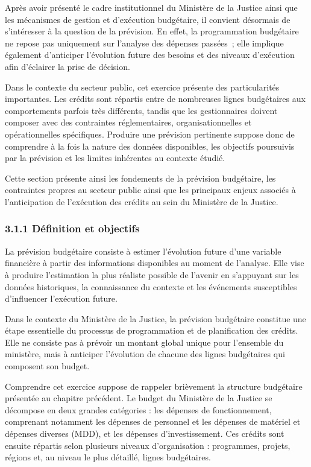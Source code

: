 Apr\`es avoir pr\'esent\'e le cadre institutionnel du Minist\`ere de la
Justice ainsi que les m\'ecanismes de gestion et d'ex\'ecution budg\'etaire,
il convient d\'esormais de s'int\'eresser \`a la question de la pr\'evision.
En effet, la programmation budg\'etaire ne repose pas uniquement sur
l'analyse des d\'epenses pass\'ees~; elle implique \'egalement d'anticiper
l'\'evolution future des besoins et des niveaux d'ex\'ecution afin
d'\'eclairer la prise de d\'ecision.

Dans le contexte du secteur public, cet exercice pr\'esente des
particularit\'es importantes. Les cr\'edits sont r\'epartis entre de
nombreuses lignes budg\'etaires aux comportements parfois tr\`es
diff\'erents, tandis que les gestionnaires doivent composer avec des
contraintes r\'eglementaires, organisationnelles et op\'erationnelles
sp\'ecifiques. Produire une pr\'evision pertinente suppose donc de
comprendre \`a la fois la nature des donn\'ees disponibles, les objectifs
poursuivis par la pr\'evision et les limites inh\'erentes au contexte
\'etudi\'e.

Cette section pr\'esente ainsi les fondements de la pr\'evision
budg\'etaire, les contraintes propres au secteur public ainsi que les
principaux enjeux associ\'es \`a l'anticipation de l'ex\'ecution des
cr\'edits au sein du Minist\`ere de la Justice.

\subsubsection*{3.1.1 \quad D\'efinition et objectifs}
La prévision budgétaire consiste à estimer l'évolution future d'une variable financière à partir des informations disponibles au moment de l'analyse. Elle vise à produire l'estimation la plus réaliste possible de l'avenir en s'appuyant sur les données historiques, la connaissance du contexte et les événements susceptibles d'influencer l'exécution future.

Dans le contexte du Ministère de la Justice, la prévision budgétaire constitue une étape essentielle du processus de programmation et de planification des crédits. Elle ne consiste pas à prévoir un montant global unique pour l'ensemble du ministère, mais à anticiper l'évolution de chacune des lignes budgétaires qui composent son budget.

Comprendre cet exercice suppose de rappeler brièvement la structure budgétaire présentée au chapitre précédent. Le budget du Ministère de la Justice se décompose en deux grandes catégories : les dépenses de fonctionnement, comprenant notamment les dépenses de personnel et les dépenses de matériel et dépenses diverses (MDD), et les dépenses d'investissement. Ces crédits sont ensuite répartis selon plusieurs niveaux d'organisation : programmes, projets, régions et, au niveau le plus détaillé, lignes budgétaires.

